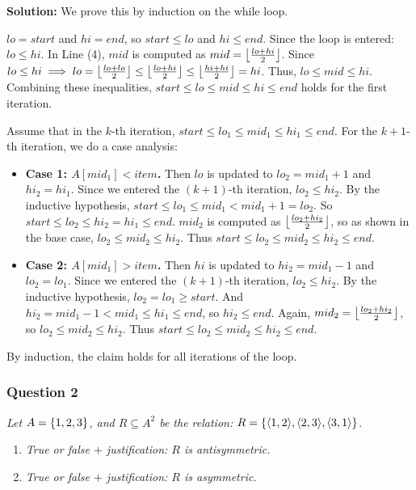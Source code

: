 \documentclass[
	letterpaper, %
	11pt, %
]{CSUniSchoolLabReport}
\newcommand{\tuple}[1]{\ensuremath{\left\langle #1 \right\rangle}\xspace}
\newcommand{\set}[1]{\ensuremath{\left\{#1\right\}}\xspace}
\newcommand{\myfloor}[1]{\ensuremath{\left\lfloor#1\right\rfloor}\xspace}
\let\originalleft\left
\let\originalright\right
\renewcommand{\left}{\mathopen{}\mathclose\bgroup\originalleft}
\renewcommand{\right}{\aftergroup\egroup\originalright}
\begin{document}
\pagebreak
\textbf{Solution:} We prove this by induction on the while loop.

$lo = start$ and $hi = end$, so $start \le lo$ and $hi \le end$.
Since the loop is entered: $lo \le hi$.
In Line (4), $mid$ is computed as $mid = \myfloor{\frac{lo + hi}{2}}$.
Since $lo \le hi \implies lo = \myfloor{\frac{lo + lo}{2}} \le \myfloor{\frac{lo + hi}{2}} \le \myfloor{\frac{hi + hi}{2}} = hi$.
Thus, $lo \le mid \le hi$.
Combining these inequalities, $start \le lo \le mid \le hi \le end$ holds for the first iteration.

Assume that in the $k$-th iteration, $start \le lo_1 \le mid_1 \le hi_1 \le end$. For the $k+1$-th iteration, we do a case analysis:

\begin{itemize}
    \item \textbf{Case 1: $A[mid_1] < item$.} Then $lo$ is updated to $lo_2 = mid_1 + 1$ and $hi_2 = hi_1$.
    Since we entered the $(k+1)$-th iteration, $lo_2 \le hi_2$.
    By the inductive hypothesis, $start \le lo_1 \le mid_1 < mid_1 + 1 = lo_2$.
    So $start \le lo_2 \le hi_2 = hi_1 \le end$.
    $mid_2$ is computed as $\myfloor{\frac{lo_2 + hi_2}{2}}$, so as shown in the base case, $lo_2 \le mid_2 \le hi_2$.
    Thus $start \le lo_2 \le mid_2 \le hi_2 \le end$.

    \item \textbf{Case 2: $A[mid_1] > item$.} Then $hi$ is updated to $hi_2 = mid_1 - 1$ and $lo_2 = lo_1$.
    Since we entered the $(k+1)$-th iteration, $lo_2 \le hi_2$.
    By the inductive hypothesis, $lo_2 = lo_1 \ge start$. And $hi_2 = mid_1 - 1 < mid_1 \le hi_1 \le end$, so $hi_2 \le end$.
    Again, $mid_2 = \myfloor{\frac{lo_2 + hi_2}{2}}$, so $lo_2 \le mid_2 \le hi_2$.
    Thus $start \le lo_2 \le mid_2 \le hi_2 \le end$.
\end{itemize}

By induction, the claim holds for all iterations of the loop.

\pagebreak

\subsubsection*{Question 2}
\textit{Let $A = \set{1,2,3}$, and $R\subseteq A^2$ be the relation: $R = \set{\tuple{1,2}, \tuple{2,3}, \tuple{3,1}}$.}
\begin{enumerate}
\item \textit{True or false $+$ justification: $R$ is antisymmetric.}
\item \textit{True or false $+$ justification: $R$ is asymmetric.}
\end{enumerate}
\end{document}
